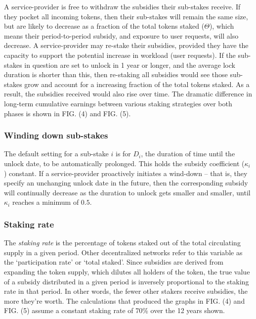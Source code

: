 \documentclass[longbibliography,nofootinbib]{revtex4-1}
\begin{document}
A service-provider is free to withdraw the subsidies their sub-stakes receive. If they pocket all incoming tokens, then their sub-stakes will remain the same size, but are likely to decrease as a fraction of the total tokens staked ($\Theta$), which means their period-to-period subsidy, and exposure to user requests, will also decrease. A service-provider may re-stake their subsidies, provided they have the capacity to support the potential increase in workload (user requests). If the sub-stakes in question are set to unlock in 1 year or longer, and the average lock duration is shorter than this, then re-staking all subsidies would see those sub-stakes grow and account for a increasing fraction of the total tokens staked. As a result, the subsidies received would also rise over time. The dramatic difference in long-term cumulative earnings between various staking strategies over both phases is shown in FIG. (4) and FIG. (5). 

\subsubsection{Winding down sub-stakes}

The default setting for a sub-stake $i$ is for $D_i$, the duration of time until the unlock date, to be automatically prolonged. This holds the subsidy coefficient ($\kappa_i$) constant. If a service-provider proactively initiates a wind-down – that is, they specify an unchanging unlock date in the future, then the corresponding subsidy will continually decrease as the duration to unlock gets smaller and smaller, until $\kappa_i$ reaches a minimum of $0.5$.

\subsubsection{Staking rate}

The \textit{staking rate} is the percentage of tokens staked out of the total circulating supply in a given period. Other decentralized networks refer to this variable as the `participation rate' or `total staked'. Since subsidies are derived from expanding the token supply, which dilutes all holders of the token, the true value of a subsidy distributed in a given period is inversely proportional to the staking rate in that period. In other words, the fewer other stakers receive subsidies, the more they're worth. The calculations that produced the graphs in FIG. (4) and FIG. (5) assume a constant staking rate of 70\% over the 12 years shown.
\end{document}
